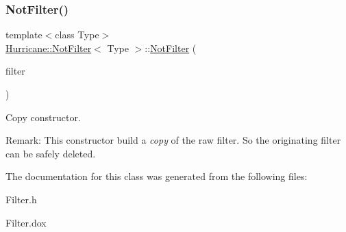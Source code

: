 \subsubsection{\texorpdfstring{Not\+Filter()}{NotFilter()}\hspace{0.1cm}{\footnotesize\ttfamily [2/2]}}
{\footnotesize\ttfamily template$<$class Type$>$ \\
\mbox{\hyperlink{classHurricane_1_1NotFilter}{Hurricane\+::\+Not\+Filter}}$<$ Type $>$\+::\mbox{\hyperlink{classHurricane_1_1NotFilter}{Not\+Filter}} (\begin{DoxyParamCaption}\item[{const \mbox{\hyperlink{classHurricane_1_1NotFilter}{Not\+Filter}}$<$ Type $>$ \&}]{filter }\end{DoxyParamCaption})\hspace{0.3cm}{\ttfamily [inline]}}

Copy constructor.

\begin{DoxyParagraph}{Remark\+: This constructor build a {\itshape copy} of the raw filter. So the originating}
filter can be safely deleted. 
\end{DoxyParagraph}


The documentation for this class was generated from the following files\+:\begin{DoxyCompactItemize}
\item 
Filter.\+h\item 
Filter.\+dox\end{DoxyCompactItemize}
